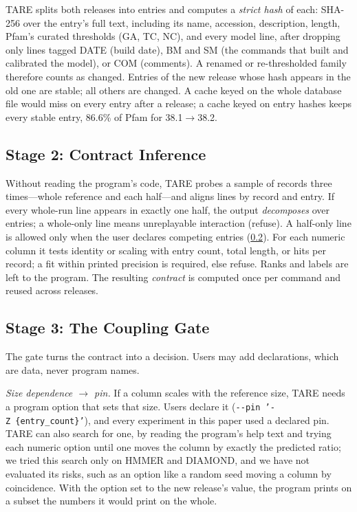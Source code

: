 \documentclass[letterpaper,twocolumn,10pt]{article}
\theoremstyle{definition}
\newcommand{\sys}{TARE\xspace}
\newcommand{\sys}{PARE\xspace}
\begin{document}
\sys splits both releases into entries and computes a \textit{strict hash} of each: SHA-256 over the entry's full
text, including its name, accession, description, length, Pfam's curated thresholds (GA, TC, NC), and every model line,
after dropping only lines tagged DATE (build date), BM and SM (the commands that built and calibrated the model), or COM
(comments). A renamed or re\nobreakdash-thresholded family therefore counts as changed. Entries of the new release whose hash appears in the old one are stable; all
others are changed. A cache keyed on the whole database file would miss on every entry after a release; a cache keyed
on entry hashes keeps every stable entry, 86.6\% of Pfam for 38.1$\rightarrow$38.2.

\subsection{Stage 2: Contract Inference}
\label{sec:contract}

Without reading the program's code, \sys probes a sample of records three times---whole reference and each half---and
aligns lines by record and entry. If every whole\nobreakdash-run line appears in exactly one half, the output \textit{decomposes}
over entries; a whole\nobreakdash-only line means unreplayable interaction (refuse). A half\nobreakdash-only line is allowed only when the
user declares competing entries (\cref{sec:gate}). For each numeric column it tests identity or scaling with entry
count, total length, or hits per record; a fit within printed precision is required, else refuse. Ranks and labels are
left to the program. The resulting \textit{contract} is computed once per command and reused across releases.

\subsection{Stage 3: The Coupling Gate}
\label{sec:gate}

The gate turns the contract into a decision. Users may add declarations, which are data, never program names.

\textit{Size dependence $\rightarrow$ pin.} If a column scales with the reference size, \sys needs a program option that
sets that size. Users declare it (\texttt{-{}-pin~'-Z~\{entry\_count\}'}), and every experiment in this paper used a
declared pin. \sys can also search for one, by reading the program's help text and trying each numeric option until one
moves the column by exactly the predicted ratio; we tried this search only on HMMER and DIAMOND, and we have not
evaluated its risks, such as an option like a random seed moving a column by coincidence. With the option set to the
new release's value, the program prints on a subset the numbers it would print on the whole.
\end{document}
